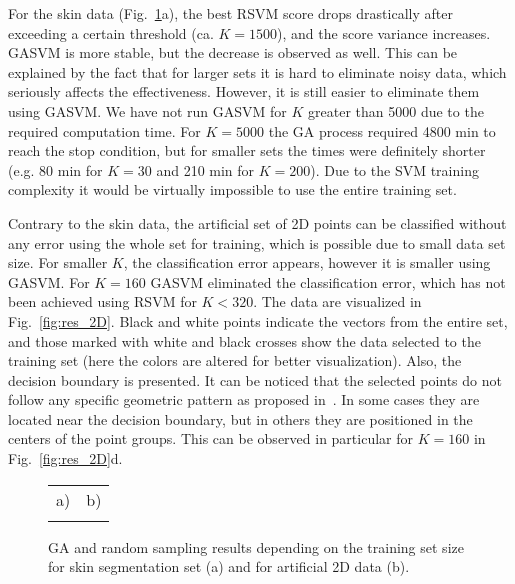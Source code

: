 \documentclass{llncs}
\begin{document}
For the skin data (Fig.~\ref{fig:res_trainsetsize}a), the best RSVM
score drops drastically after exceeding a certain threshold (ca.
$K=1500$), and the score variance increases. GASVM is more stable,
but the decrease is observed as well. This can be explained by the
fact that for larger sets it is hard to eliminate noisy data, which
seriously affects the effectiveness. However, it is still easier to eliminate them
using GASVM. We have not run GASVM for $K$ greater than 5000 due to
the required computation time. For $K=5000$ the GA process required
4800 min to reach the stop condition, but for smaller sets the times were
definitely shorter (e.g. 80 min for $K=30$ and 210 min for $K=200$). Due to the SVM training complexity it would be virtually impossible to use the entire training set.

Contrary to the skin data, the artificial set of 2D points can be
classified without any error using the whole set for training, which is possible due to small data set size. For
smaller $K$, the classification error appears, however it is smaller
using GASVM. For $K=160$ GASVM eliminated the classification error,
which has not been achieved using RSVM for $K<320$. The data are
visualized in Fig.~\ref{fig:res_2D}. Black and white points indicate
the vectors from the entire set, and those marked with white and
black crosses show the data selected to the training set (here the
colors are altered for better visualization). Also, the decision
boundary is presented. It can be noticed that the selected points do
not follow any specific geometric pattern as proposed
in~\cite{DWang2008}. In some cases they are located near the
decision boundary, but in others they are positioned in the centers
of the point groups. This can be observed in particular for $K=160$
in Fig.~\ref{fig:res_2D}d.
\begin{figure} [t]


\renewcommand{\tabcolsep}{0cm}
\newcommand{\myfigwidth}{0.29}
\newcommand{\raiseshift}{30mm}

\begin{tabular}{ll}

\scriptsize a) & \scriptsize b) \\


& %
\\

\end{tabular}

  \caption
  {
    GA and random sampling results depending on the training set
    size for skin segmentation set (a) and for artificial 2D data (b).
  }
  \label{fig:res_trainsetsize}
\end{figure}
\end{document}

